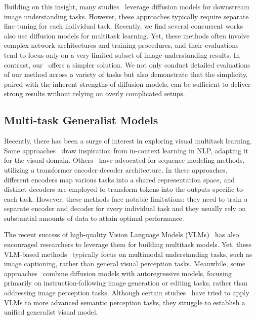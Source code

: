 Building on this insight, many studies~\cite{xu2024diffusion, he2024lotus, ye2024stablenormal, ke2024repurposing, zhu2024unleashing} leverage diffusion models for downstream image understanding tasks. However, these approaches typically require separate fine-tuning for each individual task. Recently, we find several concurrent works~\cite{wang2024lavin, le2024diffusiongenerate} also use diffusion models for multitask learning. Yet, these methods often involve complex network architectures and training procedures, and their evaluations tend to focus only on a very limited subset of image understanding results.
In contrast, our \ours\ offers a simpler solution. We not only conduct detailed evaluations of our method across a variety of tasks but also demonstrate that the simplicity, paired with the inherent strengths of diffusion models, can be sufficient to deliver strong results without relying on overly complicated setups.

\subsection{Multi-task Generalist Models}
Recently, there has been a surge of interest in exploring visual multitask learning. Some approaches~\cite{wang2023images, wang2023seggpt} draw inspiration from in-context learning in NLP, adapting it for the visual domain. Others~\cite{lu2022unified, lu2024unified, mizrahi20234m, bachmann20244m} have advocated for sequence modeling methods, utilizing a transformer encoder-decoder architecture. In these approaches, different encoders map various tasks into a shared representation space, and distinct decoders are employed to transform tokens into the outputs specific to each task. However, these methods face notable limitations: they need to train a separate encoder 
and decoder for every individual task and they usually rely on substantial amounts of data to attain optimal performance.

The recent success of high-quality Vision Language Models (VLMs)~\cite{liu2024visual} has also encouraged researchers to leverage them for building multitask models. Yet, these VLM-based methods~\cite{bai2023qwen, wang2024qwen2, chen2024internvl, lu2024deepseek, ren2024pixellm, li2025llamavid} typically focus on multimodal understanding tasks, such as image captioning, rather than general visual perception tasks. Meanwhile, some approaches~\cite{sun2024generative, zhao2024moviedreamer, pan2023kosmos} combine diffusion models with autoregressive models, focusing primarily on instruction-following image generation or editing tasks, rather than addressing image perception tasks. Although certain studies~\cite{lai2024lisa, jiang2024chatrex, cheng2024spatialrgpt, guo2024regiongpt} have tried to apply VLMs to more advanced semantic perception tasks, they struggle to establish a unified generalist visual model.



